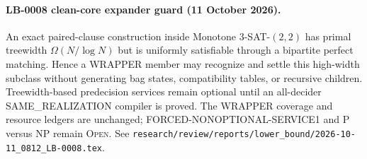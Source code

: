 \paragraph{LB-0008 clean-core expander guard (11 October 2026).}
An exact paired-clause construction inside Monotone $3$-SAT-$(2,2)$ has
primal treewidth $\Omega(N/\log N)$ but is uniformly satisfiable through a
bipartite perfect matching.  Hence a WRAPPER member may recognize and settle
this high-width subclass without generating bag states, compatibility tables,
or recursive children.  Treewidth-based predecision services remain optional
until an all-decider SAME\_REALIZATION compiler is proved.  The WRAPPER
coverage and resource ledgers are unchanged; FORCED-NONOPTIONAL-SERVICE1 and
P versus NP remain \textsc{Open}.  See
\texttt{research/review/reports/lower\_bound/2026-10-11\_0812\_LB-0008.tex}.
